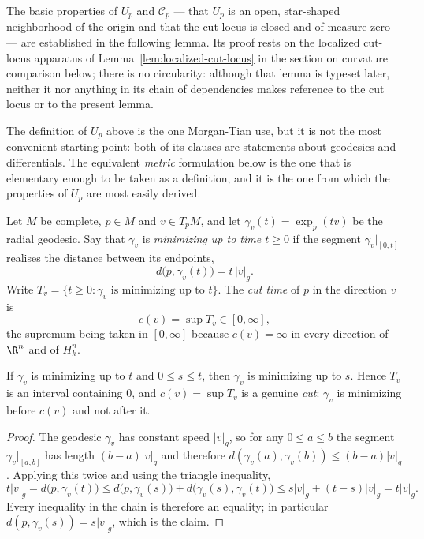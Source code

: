 The basic properties of $U_p$ and ${\mathcal C}_p$ --- that $U_p$
is an open, star-shaped neighborhood of the origin and that the
cut locus is closed and of measure zero --- are established in the
following lemma. Its proof rests on the localized cut-locus
apparatus of Lemma~\ref{lem:localized-cut-locus} in the section on
curvature comparison below; there is no circularity: although that
lemma is typeset later, neither it nor anything in its chain of
dependencies makes reference to the cut locus or to the present
lemma.

The definition of $U_p$ above is the one Morgan-Tian use, but it is not the most
convenient starting point: both of its clauses are statements about geodesics and
differentials. The equivalent \emph{metric} formulation below is the one that is
elementary enough to be taken as a definition, and it is the one from which the
properties of $U_p$ are most easily derived.

\begin{definition}
\label{def:cut-time}
\leanok
Let $M$ be complete, $p\in M$ and $v\in T_pM$, and let $\gamma_v(t)=\exp_p(tv)$ be the
radial geodesic. Say that $\gamma_v$ is \emph{minimizing up to time $t\ge 0$} if the
segment $\gamma_v|_{[0,t]}$ realises the distance between its endpoints,
$$d\bigl(p,\gamma_v(t)\bigr)=t\,\lvert v\rvert_g .$$
Write $T_v=\{t\ge0 : \gamma_v \text{ is minimizing up to } t\}$. The \emph{cut time} of
$p$ in the direction $v$ is
$$c(v)=\sup T_v\in[0,\infty],$$
the supremum being taken in $[0,\infty]$ because $c(v)=\infty$ in every direction of
$\R^n$ and of $H^n_k$.
\end{definition}

\begin{lemma}
\label{lem:minimizing-downward-closed}
\leanok
If $\gamma_v$ is minimizing up to $t$ and $0\le s\le t$, then $\gamma_v$ is minimizing up
to $s$. Hence $T_v$ is an interval containing $0$, and $c(v)=\sup T_v$ is a genuine
\emph{cut}: $\gamma_v$ is minimizing before $c(v)$ and not after it.
\end{lemma}

\begin{proof}
\leanok
The geodesic $\gamma_v$ has constant speed $\lvert v\rvert_g$, so for any $0\le a\le b$ the
segment $\gamma_v|_{[a,b]}$ has length $(b-a)\lvert v\rvert_g$ and therefore
$d(\gamma_v(a),\gamma_v(b))\le (b-a)\lvert v\rvert_g$. Applying this twice and using the
triangle inequality,
$$t\lvert v\rvert_g=d\bigl(p,\gamma_v(t)\bigr)
\le d\bigl(p,\gamma_v(s)\bigr)+d\bigl(\gamma_v(s),\gamma_v(t)\bigr)
\le s\lvert v\rvert_g+(t-s)\lvert v\rvert_g=t\lvert v\rvert_g .$$
Every inequality in the chain is therefore an equality; in particular
$d(p,\gamma_v(s))=s\lvert v\rvert_g$, which is the claim.
\end{proof}

